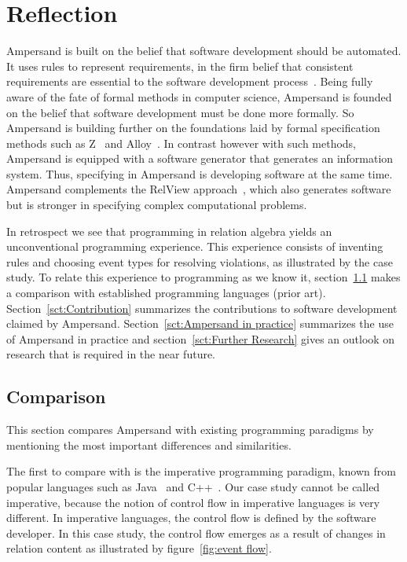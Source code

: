 \documentclass{svproc}
\begin{document}
\section{Reflection}
\label{sct:Reflection}
	Ampersand is built on the belief that software development should be automated.
	It uses rules to represent requirements, in the firm belief that consistent requirements are essential to the software development process~\cite{Boehm1981}.
	Being fully aware of the fate of formal methods in computer science, Ampersand is founded on the belief that software development must be done more formally.
	So Ampersand is building further on the foundations laid by formal specification methods
	such as Z~\cite{Z} and Alloy~\cite{Alloy2006}.
	In contrast however with such methods, Ampersand is equipped with a software generator that generates an information system.
	Thus, specifying in Ampersand is developing software at the same time.
	Ampersand complements the RelView approach~\cite{Berghammer2005}, which also generates software but is stronger in specifying complex computational problems.

	In retrospect we see that programming in relation algebra yields an unconventional programming experience.
	This experience consists of inventing rules and choosing event types for resolving violations, as illustrated by the case study.
	To relate this experience to programming as we know it, section~\ref{sct:Comparison} makes a comparison with established programming languages (prior art).
	Section~\ref{sct:Contribution} summarizes the contributions to software development claimed by Ampersand.
	Section~\ref{sct:Ampersand in practice} summarizes the use of Ampersand in practice and
	section~\ref{sct:Further Research} gives an outlook on research that is required in the near future.

\subsection{Comparison}
\label{sct:Comparison}
	This section compares Ampersand with existing programming paradigms by mentioning the most important differences and similarities.

	The first to compare with is the imperative programming paradigm, known from popular languages such as Java~\cite{Java} and C++~\cite{Stroustrup97a}.
	Our case study cannot be called imperative, because the notion of control flow in imperative languages is very different.
	In imperative languages, the control flow is defined by the software developer.
	In this case study, the control flow emerges as a result of changes in relation content as illustrated
	by figure~\ref{fig:event flow}.
\end{document}

